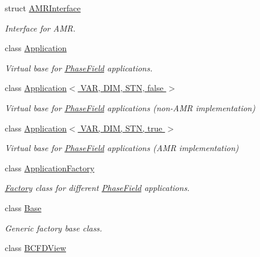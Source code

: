 \begin{DoxyCompactItemize}
\item 
struct \hyperlink{structUintah_1_1PhaseField_1_1AMRInterface}{A\+M\+R\+Interface}
\begin{DoxyCompactList}\small\item\em Interface for A\+MR. \end{DoxyCompactList}\item 
class \hyperlink{classUintah_1_1PhaseField_1_1Application}{Application}
\begin{DoxyCompactList}\small\item\em Virtual base for \hyperlink{namespaceUintah_1_1PhaseField}{Phase\+Field} applications. \end{DoxyCompactList}\item 
class \hyperlink{classUintah_1_1PhaseField_1_1Application_3_01VAR_00_01DIM_00_01STN_00_01false_01_4}{Application$<$ V\+A\+R, D\+I\+M, S\+T\+N, false $>$}
\begin{DoxyCompactList}\small\item\em Virtual base for \hyperlink{namespaceUintah_1_1PhaseField}{Phase\+Field} applications (non-\/\+A\+MR implementation) \end{DoxyCompactList}\item 
class \hyperlink{classUintah_1_1PhaseField_1_1Application_3_01VAR_00_01DIM_00_01STN_00_01true_01_4}{Application$<$ V\+A\+R, D\+I\+M, S\+T\+N, true $>$}
\begin{DoxyCompactList}\small\item\em Virtual base for \hyperlink{namespaceUintah_1_1PhaseField}{Phase\+Field} applications (A\+MR implementation) \end{DoxyCompactList}\item 
class \hyperlink{classUintah_1_1PhaseField_1_1ApplicationFactory}{Application\+Factory}
\begin{DoxyCompactList}\small\item\em \hyperlink{classUintah_1_1PhaseField_1_1Factory}{Factory} class for different \hyperlink{namespaceUintah_1_1PhaseField}{Phase\+Field} applications. \end{DoxyCompactList}\item 
class \hyperlink{classUintah_1_1PhaseField_1_1Base}{Base}
\begin{DoxyCompactList}\small\item\em Generic factory base class. \end{DoxyCompactList}\item 
class \hyperlink{classUintah_1_1PhaseField_1_1BCFDView}{B\+C\+F\+D\+View}

\end{DoxyCompactItemize}
